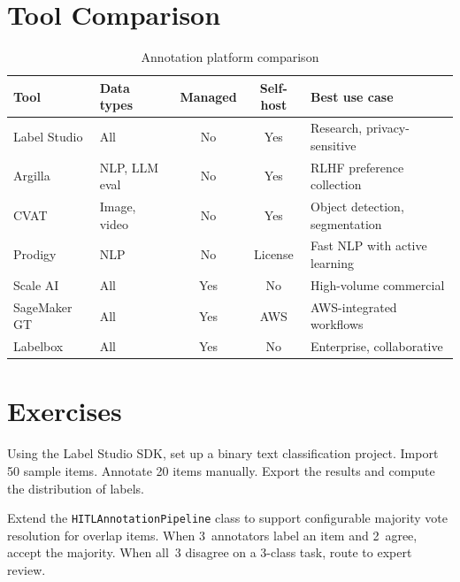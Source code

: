 \section{Tool Comparison}

\begin{table}[h]
\centering
\caption{Annotation platform comparison}
\begin{tabularx}{\textwidth}{@{}llccY@{}}
\toprule
\textbf{Tool} & \textbf{Data types} & \textbf{Managed} & \textbf{Self-host} & \textbf{Best use case} \\
\midrule
Label Studio & All           & No  & Yes      & Research, privacy-sensitive \\
Argilla      & NLP, LLM eval & No  & Yes      & RLHF preference collection \\
CVAT         & Image, video  & No  & Yes      & Object detection, segmentation \\
Prodigy      & NLP           & No  & License  & Fast NLP with active learning \\
Scale AI     & All           & Yes & No       & High-volume commercial \\
SageMaker GT & All           & Yes & AWS      & AWS-integrated workflows \\
Labelbox     & All           & Yes & No       & Enterprise, collaborative \\
\bottomrule
\end{tabularx}
\end{table}

\section{Exercises}

\begin{Exercise}
Using the Label Studio SDK, set up a binary text classification project. Import 50 sample items. Annotate 20 items manually. Export the results and compute the distribution of labels.
\end{Exercise}

\begin{Exercise}
Extend the \texttt{HITLAnnotationPipeline} class to support configurable majority vote resolution for overlap items. When 3~annotators label an item and 2~agree, accept the majority. When all~3 disagree on a 3-class task, route to expert review.
\end{Exercise}


